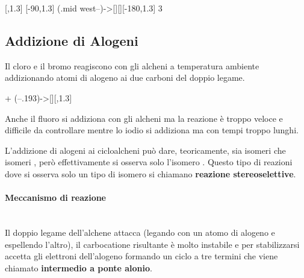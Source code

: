 \begin{reaction}
	 \+ 
	\arrow
	\arrow{->[\chemfig{-[:30]=_[:-30]}]}[,1.3]
	\arrow{->[*{0}\chemfig{-[:30]=_[:-30]}]}[-90,1.3]
	\arrow(.mid west--){->[][]}[-180,1.3]
	3 
\end{reaction}


\subsection{Addizione di Alogeni}\label{ssec:alogenazione}
Il cloro e il bromo reagiscono con gli alcheni a temperatura ambiente addizionando atomi di alogeno ai due carboni del doppio legame.
\begin{reaction*}
	 +  \arrow(--.193){->[]}[,1.3] 
\end{reaction*}
Anche il fluoro si addiziona con gli alcheni ma la reazione è troppo veloce e difficile da controllare mentre lo iodio si addiziona ma con tempi troppo lunghi.

L'addizione di alogeni ai cicloalcheni può dare, teoricamente, sia isomeri \cis\;che isomeri \trans, però effettivamente si osserva solo l'isomero \trans. Questo tipo di reazioni dove si osserva solo un tipo di isomero si chiamano \textbf{reazione stereoselettive}.

\paragraph{Meccanismo di reazione}\mbox{}\\
Il doppio legame dell'alchene attacca  (legando con un atomo di alogeno e espellendo l'altro), il carbocatione risultante è molto instabile e per stabilizzarsi accetta gli elettroni dell'alogeno formando un ciclo a tre termini che viene chiamato \textbf{intermedio a ponte alonio}.

